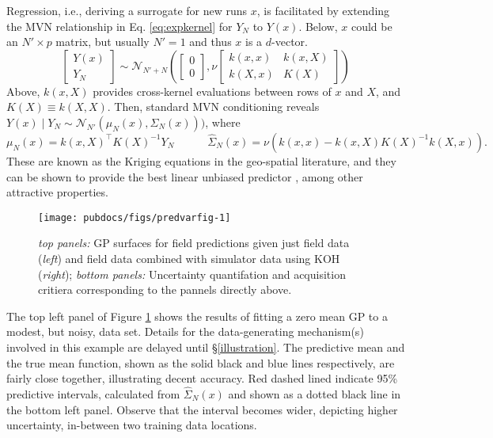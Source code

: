 \documentclass[
]{article}
\begin{document}
Regression, i.e., deriving a surrogate for new runs \(x\), is facilitated
by extending the MVN relationship in Eq. \eqref{eq:expkernel} for \(Y_N\)
to \(Y(x)\). Below, \(x\) could be an \(N' \times p\) matrix, but usually
\(N' = 1\) and thus \(x\) is a \(d\)-vector. \begin{equation}
\begin{bmatrix}
Y(x) \\
Y_N
\end{bmatrix} \sim \mathcal{N}_{N' + N}\left(\begin{bmatrix}
0\\
0
\end{bmatrix}, \nu \begin{bmatrix}
k(x,x) & k(x,X)\\
k(X,x) & K(X)
\end{bmatrix}\right) \label{eq:gpsim}
\end{equation}
Above, \(k(x, X)\) provides cross-kernel
evaluations between rows of \(x\) and \(X\), and
\(K(X) \equiv k(X,X)\). Then, standard MVN conditioning reveals
\(Y(x) \mid Y_N \sim \mathcal{N}_{N'} (\mu_N(x), \Sigma_N(x)))\), where
\begin{equation}
\mu_N(x) = k(x,X)^\top K(X)^{-1}Y_N  \quad\quad\quad
\hat{\Sigma}_N(x) = \nu (k(x,x) - k(x,X)K(X)^{-1}k(X,x)). \label{eq:krigvar}
\end{equation} These are known as the Kriging equations
\citep{matheron1963principles} in the geo-spatial literature, and they can be
shown to provide the best linear unbiased predictor
\citep{santner2018design}, among other attractive properties.

\begin{figure}[ht!]

{\centering \texttt{[image: pubdocs/figs/predvarfig-1]} 

}

\caption{\textit{top panels:} GP surfaces for field predictions given just field data (\textit{left}) and field data combined with simulator data using KOH (\textit{right}); \textit{bottom panels:} Uncertainty quantifation and acquisition critiera corresponding to the pannels directly above.}\label{fig:predvarfig}
\end{figure}

The top left panel of Figure \ref{fig:predvarfig} shows the results of fitting a zero mean GP to a modest, but noisy, data set. Details for the data-generating mechanism(s) involved in this example are delayed until \S\ref{illustration}.
The predictive mean and the true mean function, shown as the solid black and blue lines respectively, are fairly close together, illustrating decent accuracy. Red dashed lined indicate 95\% predictive intervals, calculated from \(\hat{\Sigma}_N(x)\) and shown as a dotted black line in the bottom left panel. Observe that the interval becomes wider, depicting higher uncertainty, in-between two training data locations.\\
\end{document}
